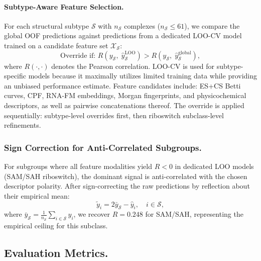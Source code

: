 \documentclass[10pt,twocolumn]{article}
\begin{document}
\paragraph{Subtype-Aware Feature Selection.}
For each structural subtype $\mathcal{S}$ with $n_\mathcal{S}$ complexes
($n_\mathcal{S} \leq 61$), we compare the global OOF predictions against
predictions from a dedicated LOO-CV model trained on a candidate feature set
$\mathcal{X}_\mathcal{S}$:
\begin{equation}
\text{Override if: } R\!\left(y_\mathcal{S},\; \hat{y}_\mathcal{S}^{\mathrm{LOO}}\right)
> R\!\left(y_\mathcal{S},\; \hat{y}_\mathcal{S}^{\mathrm{global}}\right),
\label{eq:override}
\end{equation}
where $R(\cdot,\cdot)$ denotes the Pearson correlation.
LOO-CV is used for subtype-specific models because it maximally utilizes
limited training data while providing an unbiased performance estimate.
Feature candidates include: ES+CS Betti curves, CPF, RNA-FM embeddings,
Morgan fingerprints, and physicochemical descriptors, as well as pairwise
concatenations thereof.
The override is applied sequentially: subtype-level overrides first,
then riboswitch subclass-level refinements.


\subsubsection{Sign Correction for Anti-Correlated Subgroups.}

For subgroups where all feature modalities yield $R < 0$ in dedicated LOO models
(SAM/SAH riboswitch), the dominant signal is anti-correlated with the chosen
descriptor polarity.
After sign-correcting the raw predictions by reflection about their empirical mean:
\begin{equation}
\tilde{y}_i = 2\bar{y}_{\mathcal{S}} - \hat{y}_i,
\quad i \in \mathcal{S},
\label{eq:sign_correction}
\end{equation}
where $\bar{y}_{\mathcal{S}} = \frac{1}{n_\mathcal{S}} \sum_{i \in \mathcal{S}} \hat{y}_i$,
we recover $R = 0.248$ for SAM/SAH, representing the empirical ceiling for this subclass.


\subsection{Evaluation Metrics.}
\end{document}
